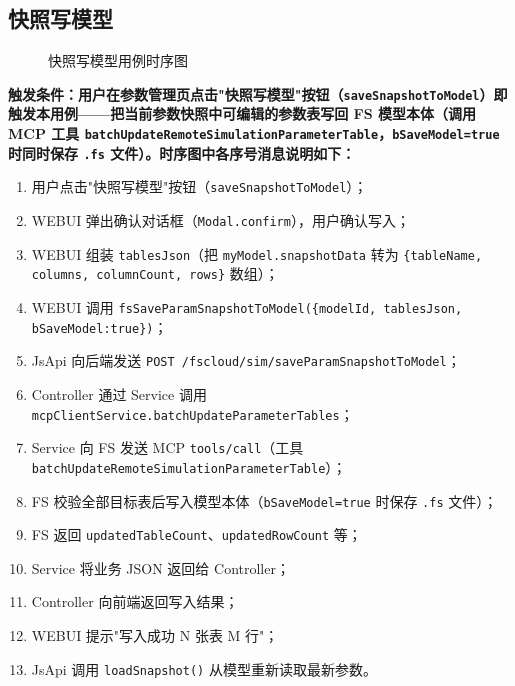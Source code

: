 \subsection{快照写模型}
\begin{figure}[!h]
	\centering
	\resizebox{1.0\linewidth}{!}{}
	\caption{快照写模型用例时序图}\label{fig:snapshotToModel}
\end{figure}
\bf{触发条件}：用户在参数管理页点击"快照写模型"按钮（\texttt{saveSnapshotToModel}）即触发本用例——把当前参数快照中可编辑的参数表写回 FS 模型本体（调用 MCP 工具 \texttt{batchUpdateRemoteSimulationParameterTable}，\texttt{bSaveModel=true} 时同时保存 \texttt{.fs} 文件）。时序图中各序号消息说明如下：
\begin{enumerate}[label=\arabic*)]
	\item 用户点击"快照写模型"按钮（\texttt{saveSnapshotToModel}）；
	\item WEBUI 弹出确认对话框（\texttt{Modal.confirm}），用户确认写入；
	\item WEBUI 组装 \texttt{tablesJson}（把 \texttt{myModel.snapshotData} 转为 \texttt{\{tableName, columns, columnCount, rows\}} 数组）；
	\item WEBUI 调用 \texttt{fsSaveParamSnapshotToModel(\{modelId, tablesJson, bSaveModel:true\})}；
	\item JsApi 向后端发送 \texttt{POST /fscloud/sim/saveParamSnapshotToModel}；
	\item Controller 通过 Service 调用 \texttt{mcpClientService.batchUpdateParameterTables}；
	\item Service 向 FS 发送 MCP \texttt{tools/call}（工具 \texttt{batchUpdateRemoteSimulationParameterTable}）；
	\item FS 校验全部目标表后写入模型本体（\texttt{bSaveModel=true} 时保存 \texttt{.fs} 文件）；
	\item FS 返回 \texttt{updatedTableCount}、\texttt{updatedRowCount} 等；
	\item Service 将业务 JSON 返回给 Controller；
	\item Controller 向前端返回写入结果；
	\item WEBUI 提示"写入成功 N 张表 M 行"；
	\item JsApi 调用 \texttt{loadSnapshot()} 从模型重新读取最新参数。
\end{enumerate}
\newpage
